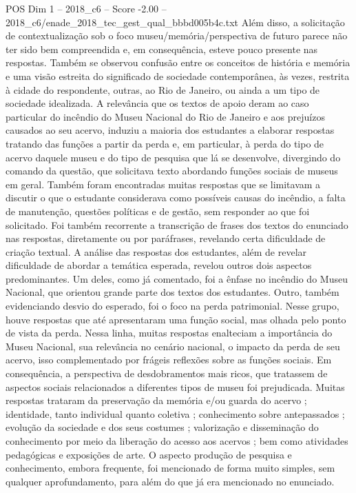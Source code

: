 \begin{textsample}{POS Dim 1 – 2018\_c6 – Score -2.00 – 2018\_c6/enade\_2018\_tec\_gest\_qual\_bbbd005b4c.txt}
Além disso, a solicitação de contextualização sob o foco museu/memória/perspectiva de futuro parece não ter sido bem compreendida e, em consequência, esteve pouco presente nas respostas.
Também se observou confusão entre os conceitos de história e memória e uma visão estreita do significado de sociedade contemporânea, às vezes, restrita à cidade do respondente, outras, ao Rio de Janeiro, ou ainda a um tipo de sociedade idealizada.
A relevância que os textos de apoio deram ao caso particular do incêndio do Museu Nacional do Rio de Janeiro e aos prejuízos causados ao seu acervo, induziu a maioria dos estudantes a elaborar respostas tratando das funções a partir da perda e, em particular, à perda do tipo de acervo daquele museu e do tipo de pesquisa que lá se desenvolve, divergindo do comando da questão, que solicitava texto abordando funções sociais de museus em geral.
Também foram encontradas muitas respostas que se limitavam a discutir o que o estudante considerava como possíveis causas do incêndio, a falta de manutenção, questões políticas e de gestão, sem responder ao que foi solicitado.
Foi também recorrente a transcrição de frases dos textos do enunciado nas respostas, diretamente ou por paráfrases, revelando certa dificuldade de criação textual.
A análise das respostas dos estudantes, além de revelar dificuldade de abordar a temática esperada, revelou outros dois aspectos predominantes.
Um deles, como já comentado, foi a ênfase no incêndio do Museu Nacional, que orientou grande parte dos textos dos estudantes.
Outro, também evidenciando desvio do esperado, foi o foco na perda patrimonial.
Nesse grupo, houve respostas que até apresentaram uma função social, mas olhada pelo ponto de vista da perda.
Nessa linha, muitas respostas enalteciam a importância do Museu Nacional, sua relevância no cenário nacional, o impacto da perda de seu acervo, isso complementado por frágeis reflexões sobre as funções sociais.
Em consequência, a perspectiva de desdobramentos mais ricos, que tratassem de aspectos sociais relacionados a diferentes tipos de museu foi prejudicada.
Muitas respostas trataram da preservação da memória e/ou guarda do acervo ; identidade, tanto individual quanto coletiva ; conhecimento sobre antepassados ; evolução da sociedade e dos seus costumes ; valorização e disseminação do conhecimento por meio da liberação do acesso aos acervos ; bem como atividades pedagógicas e exposições de arte.
O aspecto produção de pesquisa e conhecimento, embora frequente, foi mencionado de forma muito simples, sem qualquer aprofundamento, para além do que já era mencionado no enunciado.

\end{textsample}
